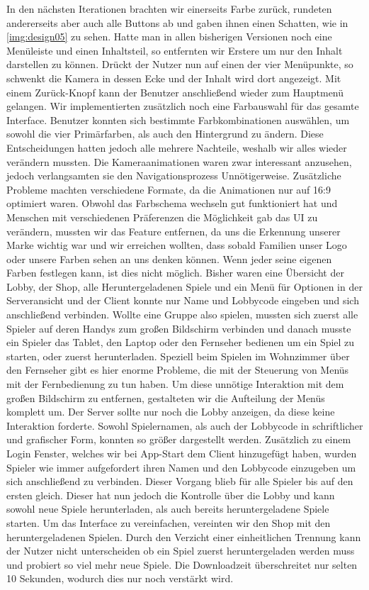 In den nächsten Iterationen brachten wir einerseits Farbe zurück, rundeten andererseits aber auch alle Buttons ab und gaben ihnen einen Schatten, wie in \ref{img:design05} zu sehen. Hatte man in allen bisherigen Versionen noch eine Menüleiste und einen Inhaltsteil, so entfernten wir Erstere um nur den Inhalt darstellen zu können. Drückt der Nutzer nun auf einen der vier Menüpunkte, so schwenkt die Kamera in dessen Ecke und der Inhalt wird dort angezeigt. Mit einem Zurück-Knopf kann der Benutzer anschließend wieder zum Hauptmenü gelangen. Wir implementierten zusätzlich noch eine Farbauswahl für das gesamte Interface. Benutzer konnten sich bestimmte Farbkombinationen auswählen, um sowohl die vier Primärfarben, als auch den Hintergrund zu ändern. Diese Entscheidungen hatten jedoch alle mehrere Nachteile, weshalb wir alles wieder verändern mussten. Die Kameraanimationen waren zwar interessant anzusehen, jedoch verlangsamten sie den Navigationsprozess Unnötigerweise. Zusätzliche Probleme machten verschiedene Formate, da die Animationen nur auf 16:9 optimiert waren. Obwohl das Farbschema wechseln gut funktioniert hat und Menschen mit verschiedenen Präferenzen die Möglichkeit gab das UI zu verändern, mussten wir das Feature entfernen, da uns die Erkennung unserer Marke wichtig war und wir erreichen wollten, dass sobald Familien unser Logo oder unsere Farben sehen an uns denken können. Wenn jeder seine eigenen Farben festlegen kann, ist dies nicht möglich.
\newline
Bisher waren eine Übersicht der Lobby, der Shop, alle Heruntergeladenen Spiele und ein Menü für Optionen in der Serveransicht und der Client konnte nur Name und Lobbycode eingeben und sich anschließend verbinden. Wollte eine Gruppe also spielen, mussten sich zuerst alle Spieler auf deren Handys zum großen Bildschirm verbinden und danach musste ein Spieler das Tablet, den Laptop oder den Fernseher bedienen um ein Spiel zu starten, oder zuerst herunterladen. Speziell beim Spielen im Wohnzimmer über den Fernseher gibt es hier enorme Probleme, die mit der Steuerung von Menüs mit der Fernbedienung zu tun haben. Um diese unnötige Interaktion mit dem großen Bildschirm zu entfernen, gestalteten wir die Aufteilung der Menüs komplett um. Der Server sollte nur noch die Lobby anzeigen, da diese keine Interaktion forderte. Sowohl Spielernamen, als auch der Lobbycode in schriftlicher und grafischer Form, konnten so größer dargestellt werden. Zusätzlich zu einem Login Fenster, welches wir bei App-Start dem Client hinzugefügt haben, wurden Spieler wie immer aufgefordert ihren Namen und den Lobbycode einzugeben um sich anschließend zu verbinden. Dieser Vorgang blieb für alle Spieler bis auf den ersten gleich. Dieser hat nun jedoch die Kontrolle über die Lobby und kann sowohl neue Spiele herunterladen, als auch bereits heruntergeladene Spiele starten. Um das Interface zu vereinfachen, vereinten wir den Shop mit den heruntergeladenen Spielen. Durch den Verzicht einer einheitlichen Trennung kann der Nutzer nicht unterscheiden ob ein Spiel zuerst heruntergeladen werden muss und probiert so viel mehr neue Spiele. Die Downloadzeit überschreitet nur selten 10 Sekunden, wodurch dies nur noch verstärkt wird. 

